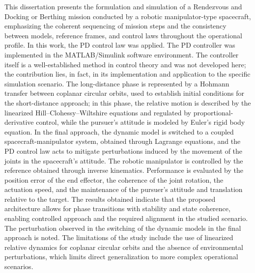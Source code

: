 This dissertation presents the formulation and simulation of a Rendezvous and Docking or Berthing mission conducted by a robotic manipulator-type spacecraft, emphasizing the coherent sequencing of mission steps and the consistency between models, reference frames, and control laws throughout the operational profile. In this work, the PD control law was applied. The PD controller was implemented in the MATLAB/Simulink software environment. The controller itself is a well-established method in control theory and was not developed here; the contribution lies, in fact, in its implementation and application to the specific simulation scenario. The long-distance phase is represented by a Hohmann transfer between coplanar circular orbits, used to establish initial conditions for the short-distance approach; in this phase, the relative motion is described by the linearized Hill–Clohessy–Wiltshire equations and regulated by proportional-derivative control, while the pursuer's attitude is modeled by Euler's rigid body equation. In the final approach, the dynamic model is switched to a coupled spacecraft-manipulator system, obtained through Lagrange equations, and the PD control law acts to mitigate perturbations induced by the movement of the joints in the spacecraft's attitude. The robotic manipulator is controlled by the reference obtained through inverse kinematics. Performance is evaluated by the position error of the end effector, the coherence of the joint rotation, the actuation speed, and the maintenance of the pursuer's attitude and translation relative to the target. The results obtained indicate that the proposed architecture allows for phase transitions with stability and state coherence, enabling controlled approach and the required alignment in the studied scenario. The perturbation observed in the switching of the dynamic models in the final approach is noted. The limitations of the study include the use of linearized relative dynamics for coplanar circular orbits and the absence of environmental perturbations, which limits direct generalization to more complex operational scenarios.